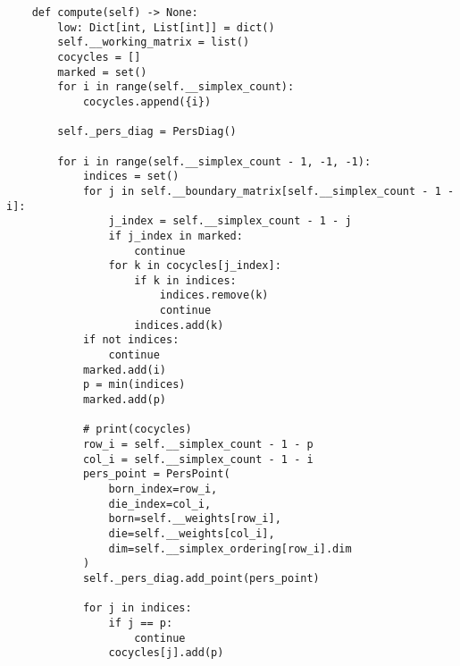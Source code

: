 \begin{verbatim}
    def compute(self) -> None:
        low: Dict[int, List[int]] = dict()
        self.__working_matrix = list()
        cocycles = []
        marked = set()
        for i in range(self.__simplex_count):
            cocycles.append({i})

        self._pers_diag = PersDiag()

        for i in range(self.__simplex_count - 1, -1, -1):
            indices = set()
            for j in self.__boundary_matrix[self.__simplex_count - 1 - i]:
                j_index = self.__simplex_count - 1 - j
                if j_index in marked:
                    continue
                for k in cocycles[j_index]:
                    if k in indices:
                        indices.remove(k)
                        continue
                    indices.add(k)
            if not indices:
                continue
            marked.add(i)
            p = min(indices)
            marked.add(p)

            # print(cocycles)
            row_i = self.__simplex_count - 1 - p
            col_i = self.__simplex_count - 1 - i
            pers_point = PersPoint(
                born_index=row_i,
                die_index=col_i,
                born=self.__weights[row_i],
                die=self.__weights[col_i],
                dim=self.__simplex_ordering[row_i].dim
            )
            self._pers_diag.add_point(pers_point)

            for j in indices:
                if j == p:
                    continue
                cocycles[j].add(p)
\end{verbatim}
